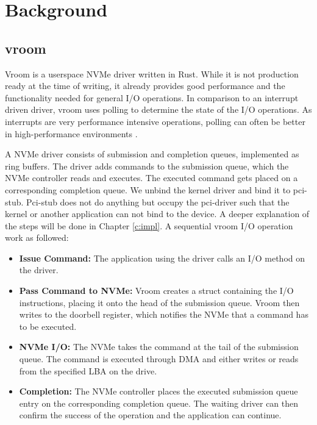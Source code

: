 \chapter{Background}

\section{vroom}
Vroom is a userspace NVMe driver written in Rust. While it is not production ready at the time of writing, it already provides good performance and the functionality needed for general I/O operations. In comparison to an interrupt driven driver, vroom uses polling to determine the state of the I/O operations. As interrupts are very performance intensive operations, polling can often be better in high-performance environments \cite{spdksubmitting}.

A NVMe driver consists of submission and completion queues, implemented as ring buffers. The driver adds commands to the submission queue, which the NVMe controller reads and executes. The executed command gets placed on a corresponding completion queue.
We unbind the kernel driver and bind it to pci-stub. Pci-stub does not do anything but occupy the pci-driver such that the kernel or another application can not bind to the device. A deeper explanation of the steps will be done in Chapter \autoref{c:impl}.
A sequential vroom I/O operation work as followed:
\begin{itemize}
    \item \textbf{Issue Command:} The application using the driver calls an I/O method on the driver.
    \item \textbf{Pass Command to NVMe:} Vroom creates a struct containing the I/O instructions, placing it onto the head of the submission queue. Vroom then writes to the doorbell register, which notifies the NVMe that a command has to be executed.
    \item \textbf{NVMe I/O:} The NVMe takes the command at the tail of the submission queue. The command is executed through DMA and either writes or reads from the specified LBA on the drive.
    \item \textbf{Completion:} The NVMe controller places the executed submission queue entry on the corresponding completion queue. The waiting driver can then confirm the success of the operation and the application can continue.
\end{itemize}

